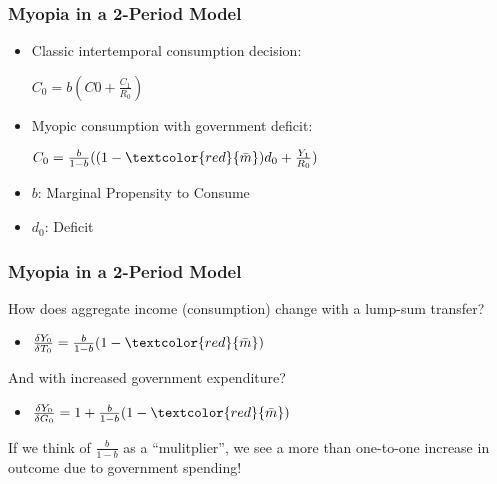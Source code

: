 \documentclass{beamer}
\begin{document}

\begin{frame}
	\frametitle{Myopia in a 2-Period Model}
	\begin{itemize}
		\item Classic intertemporal consumption decision:\\
		\vspace{8pt}
		\begin{center}
			$C_{0}=b(C{0}+\frac {C_{1}}{R_{0}})$
		\end{center}
		\vspace{8pt}
		\item Myopic consumption with government deficit:\\
		\vspace{8pt}
		\begin{center}
			$C_{0}=\frac {b}{1-b}((1- \textcolor{red}{\bar m})d_{0}+\frac {Y_{1}}{R_{0}})$
	\end{center}
	\end{itemize}
	\vspace{8pt}
	\begin{itemize}
		\item $b$: Marginal Propensity to Consume
		\item $d_{0}$: Deficit
	\end{itemize}
\end{frame}


\begin{frame}
\frametitle{Myopia in a 2-Period Model}
	How does aggregate income (consumption) change with a lump-sum transfer?
	\vspace{8pt}
	\begin{itemize}
			\item $\frac{\delta Y_{0}}{\delta T_{0}}=\frac{b}{1-b}(1-\textcolor{red}{\bar m})$
	\end{itemize}
	\vspace{8pt}
	And with increased government expenditure?
	\vspace{8pt}
	\begin{itemize}
			\item $\frac{\delta Y_{0}}{\delta G_{0}}=1+\frac{b}{1-b}(1-\textcolor{red}{\bar m})$
			\vspace{10pt}
	\end{itemize}
	If we think of $\frac{b}{1-b}$ as a ``mulitplier'', we see a more than one-to-one increase in outcome due to government spending!
\end{frame}
\end{document}
